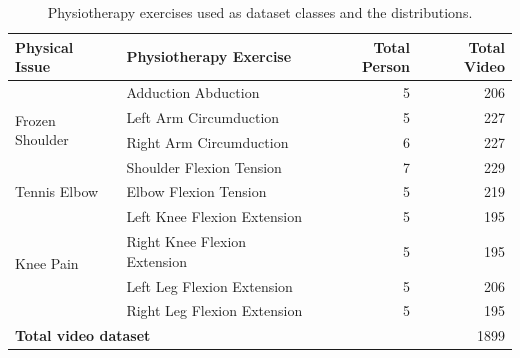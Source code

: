 \begin{table}[h!]
	\caption{Physiotherapy exercises used as dataset classes and the distributions.}
	\label{tab:class-dataset}
	\centering
	\begin{tabularx}{\textwidth}{|l|X|r|r|}
		\hline
		\textbf{Physical Issue}                            & \textbf{Physiotherapy \newline Exercise} & \textbf{Total Person} & \textbf{Total Video} \\ \hline
		\multirow{4}{*}{Frozen Shoulder}
		                                                   & Adduction \newline Abduction             & 5                     & 206                  \\ \cline{2-4}
		                                                   & Left Arm \newline Circumduction          & 5                     & 227                  \\ \cline{2-4}
		                                                   & Right Arm \newline Circumduction         & 6                     & 227                  \\ \cline{2-4}
		                                                   & Shoulder Flexion \newline Tension        & 7                     & 229                  \\ \hline
		Tennis Elbow                                       & Elbow Flexion \newline Tension           & 5                     & 219                  \\ \hline
		\multirow{4}{*}{Knee Pain}
		                                                   & Left Knee Flexion \newline Extension     & 5                     & 195                  \\ \cline{2-4}
		                                                   & Right Knee Flexion \newline Extension    & 5                     & 195                  \\ \cline{2-4}
		                                                   & Left Leg Flexion \newline Extension      & 5                     & 206                  \\ \cline{2-4}
		                                                   & Right Leg Flexion \newline Extension     & 5                     & 195                  \\ \hline
		\multicolumn{3}{|l|}{\textbf{Total video dataset}} & 1899                                                                                    \\ \hline
	\end{tabularx}
\end{table}

